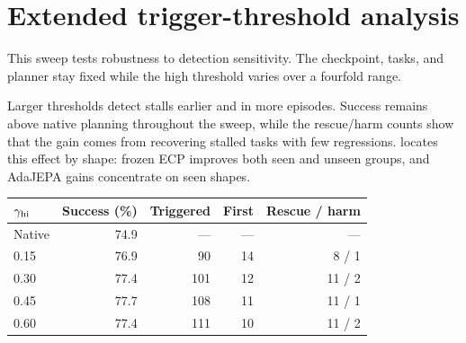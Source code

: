 \begin{table}[!t]
\begin{minipage}[t]{\columnwidth}
\section{Extended trigger-threshold analysis}
\label{sec:threshold-details}
This sweep tests robustness to detection sensitivity. The checkpoint, tasks, and planner stay fixed while the high threshold varies over a fourfold range.\par\smallskip
\normalsize
Larger thresholds detect stalls earlier and in more episodes. Success remains above native planning throughout the sweep, while the rescue/harm counts show that the gain comes from recovering stalled tasks with few regressions.  locates this effect by shape: frozen ECP improves both seen and unseen groups, and AdaJEPA gains concentrate on seen shapes.\par
\end{minipage}\hfill
\begin{minipage}[t]{\columnwidth}
\vspace{0pt}
\par\smallskip
{\centering
\centering
{}
\label{tab:threshold}
\small
\setlength{\tabcolsep}{4pt}
\begin{tabular}{lrrrr}
\toprule
$\gamma_{\rm hi}$ & Success (\%) & Triggered & First & Rescue / harm\\
\midrule
Native &74.9&---&---&---\\
0.15 &76.9&90&14&8 / 1\\
0.30 &77.4&101&12&11 / 2\\
0.45 &77.7&108&11&11 / 1\\
0.60 &77.4&111&10&11 / 2\\
\bottomrule
\end{tabular}
\par}
\end{minipage}\par
\par\smallskip
{\centering
{}
}
\end{table}
